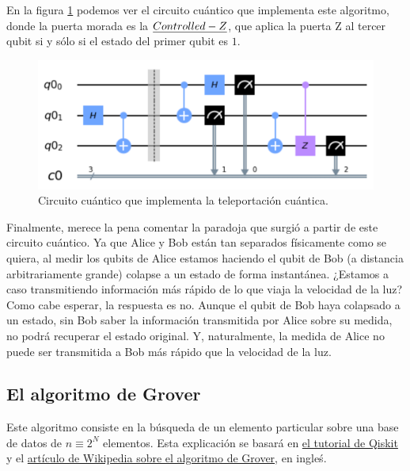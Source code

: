 \documentclass[11pt]{article}
\theoremstyle{plain}
\begin{document}
En la figura \ref{fig-teleportation} podemos ver el circuito cuántico que implementa este algoritmo, donde la puerta morada es la $\emph{Controlled-Z}$, que aplica la puerta Z al tercer qubit si y sólo si el estado del primer qubit es $1$.

\begin{figure}[H]
	\centering
	\includegraphics[scale=0.7]{figures/teleportation-circuit.pdf}
	\caption{Circuito cuántico que implementa la teleportación cuántica.}
	\label{fig-teleportation}
\end{figure}

Finalmente, merece la pena comentar la paradoja que surgió a partir de este circuito cuántico. Ya que Alice y Bob están tan separados físicamente como se quiera, al medir los qubits de Alice estamos haciendo el qubit de Bob (a distancia arbitrariamente grande) colapse a un estado de forma instantánea. ¿Estamos a caso transmitiendo información más rápido de lo que viaja la velocidad de la luz? \\

Como cabe esperar, la respuesta es no. Aunque el qubit de Bob haya colapsado a un estado, sin Bob saber la información transmitida por Alice sobre su medida, no podrá recuperar el estado original. Y, naturalmente, la medida de Alice no puede ser transmitida a Bob más 
rápido que la velocidad de la luz.


\subsection{El algoritmo de Grover}

Este algoritmo consiste en la búsqueda de un elemento particular sobre una base de datos de $ n \equiv 2^N$ elementos. Esta explicación se basará en \href{https://qiskit.org/textbook/ch-algorithms/grover.html}{el tutorial de Qiskit} y el \href{https://en.wikipedia.org/wiki/Grover\%27s_algorithm}{artículo de Wikipedia sobre el algoritmo de Grover}, en ingleś. \\
\end{document}
